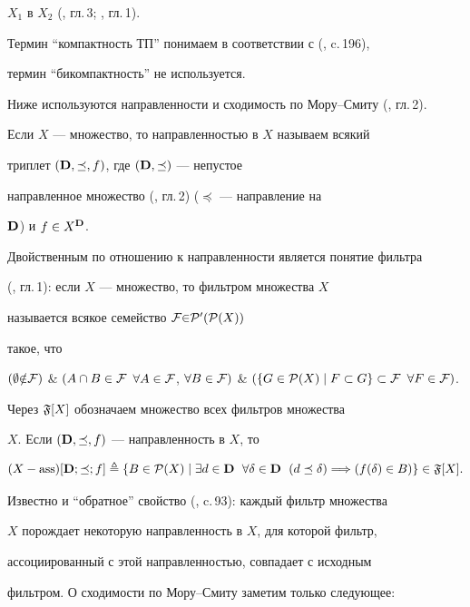 $X_1$ в ${X_2}$ (\cite{1}, гл.\,3; \cite{4}, гл.\,1).


Термин ``компактность ТП'' понимаем в соответствии с (\cite{4}, c.\,196),


термин ``бикомпактность'' не используется.





Ниже используются направленности и сходимость по Мору--Смиту (\cite{1}, гл.\,2).


Если $X$ --- множество, то направленностью в $X$ называем всякий


триплет $({\bold D},\preceq,f)$, где $({\bold D},\preceq)$ --- непустое


направленное множество (\cite{1}, гл.\,2) ($\preceq$ --- направление на


${\bold D}$) и $f \in X^{\bold D}$.


Двойственным по отношению к направленности является понятие фильтра


(\cite{4}, гл.\,1): если $X$ --- множество, то фильтром множества $X$


называется всякое семейство ${\cal F}{\in}{\cal P}'({\cal P}(X))$


такое, что


$(\emp {\notin} {\cal F})$ \& $(A\cap{B} \in {\cal F}$ \; $\fo{A} \in


{\cal F}$, \; $\fo{B} \in {\cal F})$ \& $(\{G \in {\cal P}(X) \mid


F \subset G\} \subset {\cal F}$ \; $\fo{F} \in {\cal F})$.


Через ${\frak F}[X]$ обозначаем множество всех фильтров множества


$X$. Если $({\bold D},\preceq,f)$ --- направленность в $X$, то


$$


(X-\ass)[{\bold D};\preceq;f] \triangleq \{B \in {\cal P}(X) \mid


\exi{d} \in {\bold D}\ \; \fo{\delta} \in {\bold D} \ \;


(d\preceq\delta) \Lo({f(\delta)} \in B)\} \in {\frak F}[X].


$$ 


Известно и ``обратное'' свойство (\cite{4}, c.\,93): каждый фильтр множества


$X$ порождает некоторую направленность в $X$, для которой фильтр,


ассоциированный с этой направленностью, совпадает с исходным


фильтром. О сходимости по Мору--Смиту заметим только следующее:


